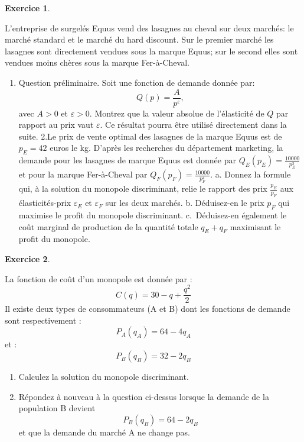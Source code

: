 \documentclass[
]{book}
\providecommand{\tightlist}{%
  \setlength{\itemsep}{0pt}\setlength{\parskip}{0pt}}
\theoremstyle{definition}
\theoremstyle{definition}
\theoremstyle{definition}
\newtheorem{exercise}{Exercice}[chapter]
\theoremstyle{definition}
\theoremstyle{remark}
\begin{document}
\begin{exercise}
\protect\hypertarget{exr:discriminationexo2}{}\label{exr:discriminationexo2}

L'entreprise de surgelés Equus vend des lasagnes au cheval sur deux marchés: le marché standard et le marché du hard discount. Sur le premier marché les lasagnes sont directement vendues sous la marque Equus; sur le second elles sont vendues moins chères sous la marque Fer-à-Cheval.

\begin{enumerate}
\def\labelenumi{\arabic{enumi}.}
\tightlist
\item
  Question préliminaire. Soit une fonction de demande donnée par:
  \[Q(p)=\frac{A}{p^\varepsilon},\] avec \(A>0\) et \(\varepsilon >0\). Montrez que la valeur absolue de l'élasticité de \(Q\) par rapport au prix vaut \(\varepsilon\). Ce résultat pourra être utilisé directement dans la suite.
  2.Le prix de vente optimal des lasagnes de la marque Equus est de \(p_E=42\) euros le kg. D'après les recherches du département marketing, la demande pour les lasagnes de marque Equus est donnée par \(Q_E(p_E)=\frac{10000}{p_E^2}\) et pour la marque Fer-à-Cheval par \(Q_F(p_F)=\frac{10000}{p_F^4}\).
  a. Donnez la formule qui, à la solution du monopole discriminant, relie le rapport des prix \(\frac{p_E}{p_F}\) aux élasticités-prix \(\varepsilon_E\) et \(\varepsilon_F\) sur les deux marchés.
  b. Déduisez-en le prix \(p_F\) qui maximise le profit du monopole discriminant.
  c.~Déduisez-en également le coût marginal de production de la quantité totale \(q_E+q_F\) maximisant le profit du monopole.
\end{enumerate}

\end{exercise}

\begin{exercise}
\protect\hypertarget{exr:discriminationexo3}{}\label{exr:discriminationexo3}

La fonction de coût d'un monopole est donnée par :
\[C(q)=30-q+\frac{q^2}{2}\] Il existe deux types de consommateurs (A et
B) dont les fonctions de demande sont respectivement :
\[P_{A}(q_{A})=64-4q_{A}\] et : \[P_{B}(q_{B})=32-2q_{B}\]

\begin{enumerate}
\def\labelenumi{\arabic{enumi}.}
\tightlist
\item
  Calculez la solution du monopole discriminant.
\item
  Répondez à nouveau à la question ci-dessus lorsque la
  demande de la population B devient \[P_{B}(q_{B})=64-2q_{B}\] et que
  la demande du marché A ne change pas.
\end{enumerate}

\end{exercise}
\end{document}
